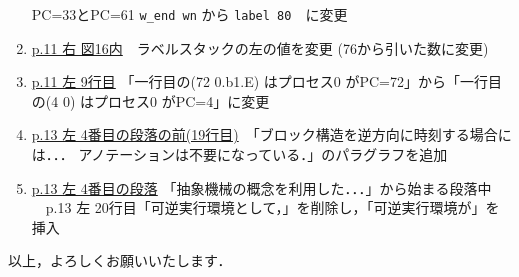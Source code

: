 \documentclass{jarticle}
\begin{document}
\begin{enumerate}
          PC=33とPC=61  \texttt{w\_end wn} から  \texttt{label 80}　に変更
\item \underline{p.11 右 図16内}　ラベルスタックの左の値を変更 (76から引いた数に変更)
\item \underline{p.11 左 9行目} 「一行目の(72 0.b1.E) はプロセス0 がPC=72」から「一行目の(4 0) はプロセス0 がPC=4」に変更
\item \underline{p.13 左 4番目の段落の前(19行目)}　「ブロック構造を逆方向に時刻する場合には．．．
アノテーションは不要になっている．」のパラグラフを追加
\item \underline{p.13 左 4番目の段落} 「抽象機械の概念を利用した．．．」から始まる段落中\\
　p.13 左 20行目「可逆実行環境として，」を削除し，「可逆実行環境が」を挿入
\end{enumerate}

以上，よろしくお願いいたします．
\end{document}
